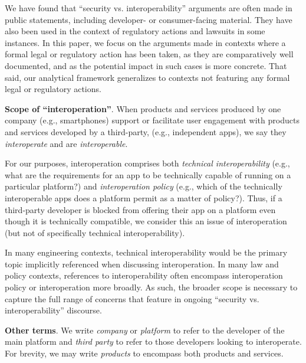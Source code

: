 \documentclass[letterpaper,twocolumn,10pt]{article}
\newcommand{\subh}[1]{\smallskip \noindent \textbf{{#1}}.}
\renewcommand{\paragraph}[1]{\subh{#1}}
\begin{document}
We have found that ``security vs. interoperability'' arguments are often made in public statements, including developer- or consumer-facing material. They have also been used in the context of regulatory actions and lawsuits in some instances. In this paper, we focus on the arguments made in contexts where a formal legal or regulatory action has been taken, as they are comparatively well documented, and as the potential impact in such cases is more concrete. That said, our analytical framework generalizes to contexts not featuring any formal legal or regulatory actions.

\paragraph{Scope of ``interoperation''}
%
When products and services produced by one company (e.g., smartphones) support or facilitate user engagement with products and services developed by a third-party, (e.g., independent apps), we say they \emph{interoperate} and are \emph{interoperable}.

For our purposes, interoperation comprises both \emph{technical interoperability} (e.g., what are the requirements for an app to be technically capable of running on a particular platform?) and \emph{interoperation policy} (e.g., which of the technically interoperable apps does a platform permit as a matter of policy?). 
Thus, if a third-party developer is blocked from offering their app on a platform even though it is technically compatible, we consider this an issue of interoperation (but not of specifically technical interoperability). 

In many engineering contexts, technical interoperability would be the primary topic implicitly referenced when discussing interoperation. 
In many law and policy contexts, references to interoperability often encompass interoperation policy or interoperation more broadly.
As such, the broader scope is necessary to capture the full range of concerns that feature in ongoing ``security vs. interoperability'' discourse. 

\paragraph{Other terms} We write \emph{company} or \emph{platform} to refer to the developer of the main platform and \emph{third party} to refer to those developers looking to interoperate. For brevity, we may write \emph{products} to encompass both products and services.
\end{document}
